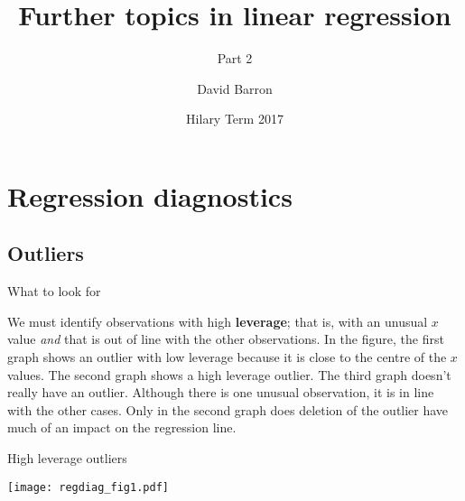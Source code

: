 \documentclass[10pt,ignorenonframetext,]{beamer}
\title{Further topics in linear regression}
\subtitle{Part 2}
\author{David Barron}
\date{Hilary Term 2017}
\begin{document}
\frame{\titlepage}

\section{Regression diagnostics}\label{regression-diagnostics}

\subsection{Outliers}\label{outliers}

\begin{frame}{What to look for}

We must identify observations with high \textbf{leverage}; that is, with
an unusual \(x\) value \emph{and} that is out of line with the other
observations. In the figure, the first graph shows an outlier with low
leverage because it is close to the centre of the \(x\) values. The
second graph shows a high leverage outlier. The third graph doesn't
really have an outlier. Although there is one unusual observation, it is
in line with the other cases. Only in the second graph does deletion of
the outlier have much of an impact on the regression line.

\end{frame}

\begin{frame}{High leverage outliers}

\texttt{[image: regdiag\_fig1.pdf]}

\end{frame}
\end{document}
